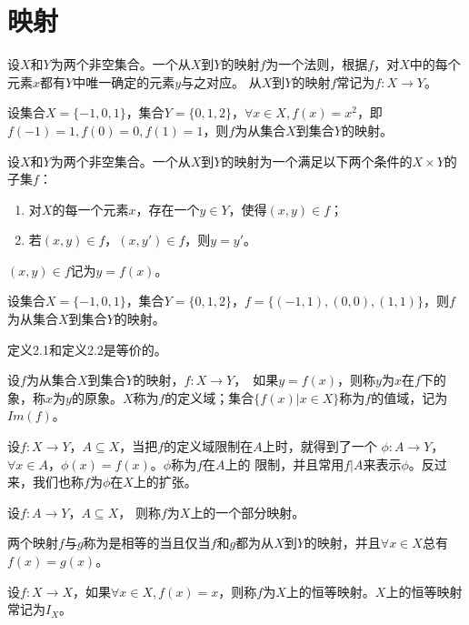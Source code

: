 \chapter{映射}

  \begin{Def}
    设$X$和$Y$为两个非空集合。一个从$X$到$Y$的映射$f$为一个法则，根据$f$，对$X$中的每个元素$x$都有$Y$中唯一确定的元素$y$与之对应。
    从$X$到$Y$的映射$f$常记为$f:X\to Y$。
  \end{Def}

  \begin{Example}
    设集合$X=\{-1,0,1\}$，集合$Y=\{0,1,2\}$，$\forall x \in X, f(x)=x^2$，即$f(-1)=1,f(0)=0,f(1)=1$，则$f$为从集合$X$到集合$Y$的映射。
  \end{Example}

  \begin{Def}
    设$X$和$Y$为两个非空集合。一个从$X$到$Y$的映射为一个满足以下两个条件的$X\times Y$的子集$f$：
    \begin{enumerate}
    \item 对$X$的每一个元素$x$，存在一个$y\in Y$，使得$(x,y) \in f$；
    \item 若$(x,y)\in f$，$(x,y')\in f$，则$y=y'$。
    \end{enumerate}
    $(x,y)\in f$记为$y=f(x)$。
  \end{Def}
  \begin{Example}
    设集合$X=\{-1,0,1\}$，集合$Y=\{0,1,2\}$，$f=\{(-1,1),(0,0),(1,1)\}$，则$f$为从集合$X$到集合$Y$的映射。
  \end{Example}

  定义2.1和定义2.2是等价的。
  \begin{Def}
    设$f$为从集合$X$到集合$Y$的映射，$f:X\to Y$，　如果$y = f(x)$，则称$y$为$x$在$f$下的象，称$x$为$y$的原象。$X$称为$f$的定义域；集合$\{f(x) | x \in X\}$称为$f$的值域，记为$Im(f)$。
  \end{Def}
  \begin{Def}
    设$f:X\to Y$，$A\subseteq X$，当把$f$的定义域限制在$A$上时，就得到了一个
    $\phi: A\to Y$，$\forall x \in A$，$\phi(x) = f(x)$。$\phi$称为$f$在$A$上的
    限制，并且常用$f|A$来表示$\phi$。反过来，我们也称$f$为$\phi$在$X$上的扩张。
  \end{Def}
    \begin{Def}
    设$f:A \to Y$，$A \subseteq X$， 则称$f$为$X$上的一个部分映射。
  \end{Def}
  \begin{Def}
    两个映射$f$与$g$称为是相等的当且仅当$f$和$g$都为从$X$到$Y$的映射，并且$\forall x \in X$总有$f(x) = g(x)$。
  \end{Def}
  \begin{Def}
    设$f:X\to X$，如果$\forall x \in X, f(x) = x$，则称$f$为$X$上的恒等映射。$X$上的恒等映射常记为$I_X$。
  \end{Def}

